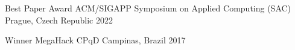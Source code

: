 

\begin{cvhonors}

  \cvhonor
    {Best Paper Award} %
    {ACM/SIGAPP Symposium on Applied Computing (SAC)} %
    {Prague, Czech Republic} %
    {2022} %

\end{cvhonors}


\begin{cvhonors}

  \cvhonor
    {Winner} %
    {MegaHack CPqD} %
    {Campinas, Brazil} %
    {2017} %

\end{cvhonors}
